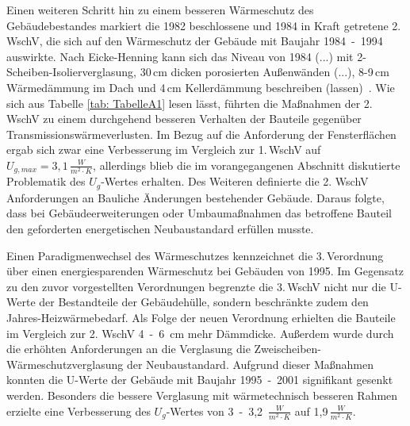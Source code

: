 Einen weiteren Schritt hin zu einem besseren Wärmeschutz des Gebäudebestandes markiert die 1982 beschlossene und 1984 in Kraft getretene 2. WschV, die sich auf den Wärmeschutz der Gebäude mit Baujahr \mbox{1984 - 1994} auswirkte.
Nach Eicke-Henning kann sich \glqq das Niveau von 1984 (...) mit 2-Scheiben-Isolierverglasung, 30\,cm dicken porosierten Außenwänden (...), 8-9\,cm Wärmedämmung im Dach und 4\,cm Kellerdämmung beschreiben (lassen) \grqq\,\cite{EickeHenning.2011}.
Wie sich aus Tabelle \ref{tab: TabelleA1} lesen lässt, führten die Maßnahmen der 2.\,WschV zu einem durchgehend besseren Verhalten der Bauteile gegenüber Transmissionswärmeverlusten. 
Im Bezug auf die Anforderung der Fensterflächen ergab sich zwar eine Verbesserung im Vergleich zur 1.\,WschV auf \(U_{g, max} = 3,1\,\frac{W}{m^2 \cdot K} \), allerdings blieb die im vorangegangenen Abschnitt diskutierte Problematik des \(U_g\)-Wertes erhalten.
Des Weiteren definierte die 2. WschV Anforderungen an \glqq Bauliche Änderungen bestehender Gebäude\grqq.
Daraus folgte, dass bei Gebäudeerweiterungen oder Umbaumaßnahmen das betroffene Bauteil den geforderten energetischen Neubaustandard erfüllen musste.

Einen Paradigmenwechsel des Wärmeschutzes kennzeichnet die 3.\,Verordnung über einen energiesparenden Wärmeschutz bei Gebäuden von 1995.
Im Gegensatz zu den zuvor vorgestellten Verordnungen begrenzte die 3.\,WschV nicht nur die U-Werte der Bestandteile der Gebäudehülle, sondern beschränkte zudem den Jahres-Heizwärmebedarf.
Als Folge der neuen Verordnung erhielten die Bauteile im Vergleich zur 2. WschV \mbox{4 - 6 cm} mehr Dämmdicke. 
Außerdem wurde durch die erhöhten Anforderungen an die Verglasung die Zweischeiben-Wärmeschutzverglasung der Neubaustandard.
Aufgrund dieser Maßnahmen konnten die U-Werte der Gebäude mit Baujahr \mbox{1995 - 2001} signifikant gesenkt werden.
Besonders die bessere Verglasung mit wärmetechnisch besseren Rahmen erzielte eine Verbesserung des \(U_g\)-Wertes von \mbox{3 - 3,2 \(\frac{W}{m^2 \cdot K} \)} auf 1,9\,\(\frac{W}{m^2 \cdot K}\).

